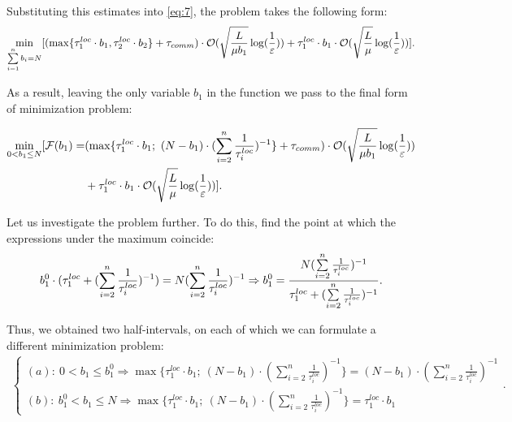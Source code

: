 \documentclass{article}
\theoremstyle{definition}
\theoremstyle{plain}
\begin{document}
Substituting this estimates into \eqref{eq:7},  the problem takes the following form:
\begin{equation}
    \notag
    \underset{\sum\limits_{i = 1}^{n} b_i = N}{\min}[(\max\{\tau_1^{loc}\cdot b_1, \tau_2^{loc}\cdot b_2\} + \tau_{comm}) \cdot \mathcal O(\sqrt{\frac{L}{\mu {b_1}}}\log(\frac{1}{\varepsilon})) + \tau_1^{loc}\cdot b_1 \cdot \mathcal O(\sqrt{\frac{L}{\mu}}\log(\frac{1}{\varepsilon}))].
\end{equation}

As a result, leaving the only variable $b_1$ in the function we pass to the final form of minimization problem:

\begin{eqnarray}
    \begin{split}
    \label{eq:fm1}
        \underset{0 < b_1 \leq N}{\min}[\mathcal{F}(b_1) = &(\max\{\tau_1^{loc}\cdot b_1; ~(N-b_1) \cdot (\sum\limits_{i = 2}^{n} \frac{1}{\tau_i^{loc}} )^{-1}\} + \tau_{comm}) \cdot \mathcal O(\sqrt{\frac{L}{\mu b_1}}\log(\frac{1}{\varepsilon}))
        \\ &+
        \tau_1^{loc}\cdot b_1 \cdot \mathcal O(\sqrt{\frac{L}{\mu}}\log(\frac{1}{\varepsilon}))]. \hspace{3.7cm}
    \end{split}
\end{eqnarray}

Let us investigate the problem further. To do this, find the point at which the expressions under the maximum coincide:
\begin{equation}
    \notag
    b_1^0 \cdot (\tau_1^{loc} + (\sum\limits_{i = 2}^{n} \frac{1}{\tau_i^{loc}})^{-1}) = N (\sum\limits_{i = 2}^{n} \frac{1}{\tau_i^{loc}})^{-1} \Rightarrow b_1^0 = \frac{N (\sum\limits_{i = 2}^{n} \frac{1}{\tau_i^{loc}})^{-1}}{\tau_1^{loc} + (\sum\limits_{i = 2}^{n} \frac{1}{\tau_i^{loc}})^{-1}}.
\end{equation}

Thus, we obtained two half-intervals, on each of which we can formulate a different minimization problem:
\begin{eqnarray*}
    \begin{cases}
    (a): ~ 0 < b_1 \leq b_1^0 \Rightarrow \max\{\tau_1^{loc}\cdot b_1; ~(N-b_1) \cdot (\sum\limits_{i = 2}^{n} \frac{1}{\tau_i^{loc}} )^{-1}\} = 
    (N-b_1) \cdot (\sum\limits_{i = 2}^{n} \frac{1}{\tau_i^{loc}})^{-1}
    \\
    (b): ~ b_1^0 <  b_1 \leq N \Rightarrow \max\{\tau_1^{loc}\cdot b_1; ~(N-b_1) \cdot (\sum\limits_{i = 2}^{n} \frac{1}{\tau_i^{loc}} )^{-1}\} = \tau_1^{loc}\cdot b_1
    \end{cases}.
\end{eqnarray*}
\end{document}
